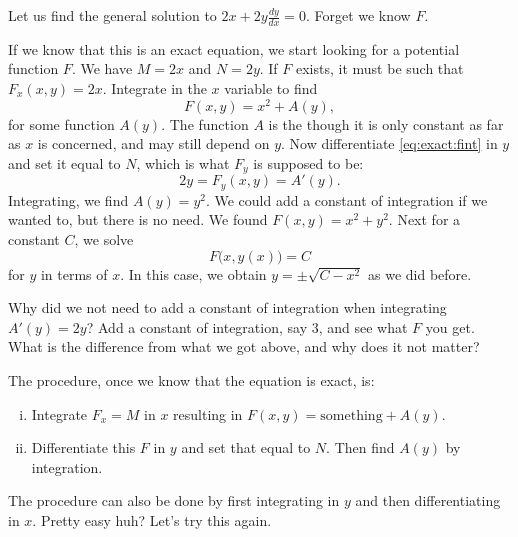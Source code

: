 \begin{example}
Let us find the general solution to
$2x + 2y \frac{dy}{dx} = 0$.  Forget we know
$F$.

If we know that this is an exact equation, we start looking for a potential
function $F$.
We have $M = 2x$ and $N=2y$.
If $F$ exists, it must be such that
$F_x (x,y) = 2x$.
Integrate in the $x$ variable to find
\begin{equation} \label{eq:exact:fint}
F(x,y) = x^2 + A(y) ,
\end{equation}
for some function $A(y)$.  The function $A$ is the  though it is only constant as far as $x$ is concerned, and
may still depend on $y$.  Now differentiate \eqref{eq:exact:fint} in $y$ 
and set it equal to $N$, which is what $F_y$ is supposed to be:
\begin{equation*}
2y = F_y (x,y) = A'(y) .
\end{equation*}
Integrating, we find $A(y) = y^2$.  We could add a constant of integration
if we wanted to, but there is no need.  We found $F(x,y) = x^2+y^2$.
Next for a constant $C$, we solve
\begin{equation*}
F\bigl(x,y(x)\bigr) = C
\end{equation*}
for $y$ in terms of $x$.  In this case, we obtain $y = \pm \sqrt{C-x^2}$
as we did before.
\end{example}

\begin{exercise}
Why did we not need to add a constant of integration when integrating $A'(y)
= 2y$?  Add a constant of integration, say $3$, and see what $F$ you get.
What is the difference from what we got above, and why does it not matter?
\end{exercise}



The procedure, once we know that the equation is exact, is:
\begin{enumerate}[(i)]
\item Integrate $F_x = M$ in $x$ resulting in $F(x,y) = \text{something} + A(y)$.
\item Differentiate this $F$ in $y$ and set that equal to
$N$.   Then find $A(y)$ by integration.
\end{enumerate}
The procedure can also be done by first integrating in $y$ and then
differentiating in $x$.
Pretty easy huh?  Let's try this again.

